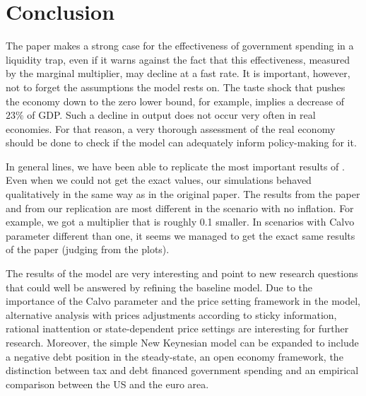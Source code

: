 \section{Conclusion}
The paper makes a strong case for the effectiveness of government spending in a liquidity trap, even if it warns against the fact that this effectiveness, measured by the marginal multiplier, may decline at a fast rate. It is important, however, not to forget the assumptions the model rests on. The taste shock that pushes the economy down to the zero lower bound, for example, implies a decrease of $23\%$ of GDP. Such a decline in output does not occur very often in real economies. For that reason, a very thorough assessment of the real economy should be done to check if the model can adequately inform policy-making for it.
\par
\bigskip
In general lines, we have been able to replicate the most important results of \citet{Erceg.2014}. Even when we could not get the exact values, our simulations behaved qualitatively in the same way as in the original paper. The results from the paper and from our replication are most different in the scenario with no inflation. For example, we got a multiplier that is roughly 0.1 smaller. In scenarios with Calvo parameter different than one, it seems we managed to get the exact same results of the paper (judging from the plots).
\par
\bigskip
The results of the model are very interesting and point to new research questions that could well be answered by refining the baseline model. Due to the importance of the Calvo parameter and the price setting framework in the model, alternative analysis with prices adjustments according to sticky information, rational inattention or state-dependent price settings are interesting for further research. Moreover, the simple New Keynesian model can be expanded to include a negative debt position in the steady-state, an open economy framework, the distinction between tax and debt financed government spending and an empirical comparison between the US and the euro area.
